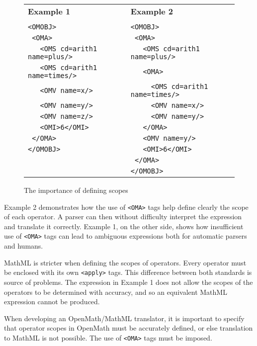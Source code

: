 \begin{figure}[h]

\begin{tabular}{ l l }

{\bf Example 1}					& {\bf Example 2}\\
						& \\
\verb|<OMOBJ>|					&\verb|<OMOBJ>|\\  
\verb| <OMA>|					&\verb| <OMA>|\\
\verb|   <OMS cd=arith1 name=plus/>|		&\verb|   <OMS cd=arith1 name=plus/>| \\
\verb|   <OMS cd=arith1 name=times/>|		&\verb|   <OMA>| \\
\verb|   <OMV name=x/>|				&\verb|     <OMS cd=arith1 name=times/>| \\
\verb|   <OMV name=y/>|				&\verb|     <OMV name=x/>| \\
\verb|   <OMV name=z/>|				&\verb|     <OMV name=y/>| \\
\verb|   <OMI>6</OMI>|				&\verb|   </OMA>| \\
\verb| </OMA>|					&\verb|   <OMV name=y/>| \\
\verb|</OMOBJ>|					&\verb|   <OMI>6</OMI>| \\
						&\verb| </OMA>| \\
						&\verb|</OMOBJ>| \\

\end{tabular}  

\caption{The importance of defining scopes}
\label{omscope}
\end{figure}  

Example 2 demonstrates how the use of \verb|<OMA>| tags help define
clearly the scope of each operator. A parser can then without
difficulty interpret the expression and translate it correctly. Example
1, on the other side, shows how insufficient use of \verb|<OMA>| tags
can lead to ambiguous expressions both for automatic parsers and
humans.

MathML is stricter when defining the scopes of operators. Every
operator must be enclosed with its own \verb|<apply>| tags. This
difference between both standards is source of problems. The expression
in Example 1 does not allow the scopes of the operators to be
determined with accuracy, and so an equivalent MathML expression cannot
be produced.

When developing an OpenMath/MathML translator, it is important to
specify that operator scopes in OpenMath must be accurately defined, or
else translation to MathML is not possible. The use of \verb|<OMA>|
tags must be imposed.

